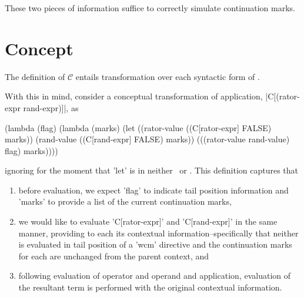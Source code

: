 
These two pieces of information suffice to correctly simulate continuation marks.

\section{Concept}

The definition of $\mathcal{C}$ entails transformation over each syntactic form of \cm.

With this in mind, consider a conceptual transformation of application, \scheme|C[(rator-expr rand-expr)]|, as
\begin{schemeblock}
\begin{schemedisplay}
(lambda (flag)
  (lambda (marks)
    (let ((rator-value ((C[rator-expr] FALSE) marks))
          (rand-value ((C[rand-expr] FALSE) marks))
      (((rator-value rand-value) flag) marks))))
\end{schemedisplay}
\end{schemeblock}
ignoring for the moment that \scheme'let' is in neither \lv\ or \cm. This definition captures that
\begin{enumerate}
\item before evaluation, we expect \scheme'flag' to indicate tail position information and \scheme'marks' to provide a list of the current continuation marks,
\item we would like to evaluate \scheme'C[rator-expr]' and \scheme'C[rand-expr]' in the same manner, providing to each its contextual information--specifically that neither is evaluated in tail position of a \scheme'wcm' directive and the continuation marks for each are unchanged from the parent context, and
\item following evaluation of operator and operand and application, evaluation of the resultant term is performed with the original contextual information.
\end{enumerate}

